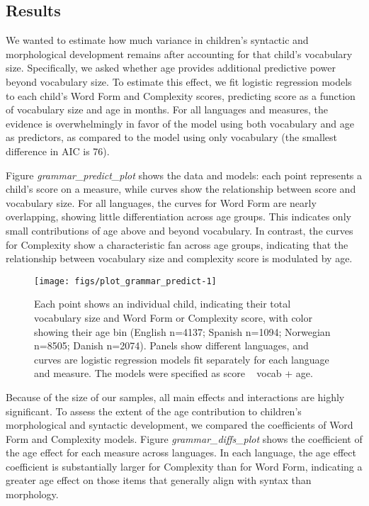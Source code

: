 \documentclass[authoryear, review]{elsarticle}
\newenvironment{CodeChunk}{}{}
\begin{document}
\subsection{Results}\label{results}

We wanted to estimate how much variance in children's syntactic and
morphological development remains after accounting for that child's
vocabulary size. Specifically, we asked whether age provides additional
predictive power beyond vocabulary size. To estimate this effect, we fit
logistic regression models to each child's Word Form and Complexity
scores, predicting score as a function of vocabulary size and age in
months. For all languages and measures, the evidence is overwhelmingly
in favor of the model using both vocabulary and age as predictors, as
compared to the model using only vocabulary (the smallest difference in
AIC is 76).

Figure \emph{grammar\_predict\_plot} shows the data and models: each
point represents a child's score on a measure, while curves show the
relationship between score and vocabulary size. For all languages, the
curves for Word Form are nearly overlapping, showing little
differentiation across age groups. This indicates only small
contributions of age above and beyond vocabulary. In contrast, the
curves for Complexity show a characteristic fan across age groups,
indicating that the relationship between vocabulary size and complexity
score is modulated by age.

\begin{CodeChunk}
\begin{figure}
\texttt{[image: figs/plot\_grammar\_predict-1]} \caption[Each point shows an individual child, indicating their total vocabulary size and Word Form or Complexity score, with color showing their age bin (English n=4137]{Each point shows an individual child, indicating their total vocabulary size and Word Form or Complexity score, with color showing their age bin (English n=4137; Spanish n=1094; Norwegian n=8505; Danish n=2074). Panels show different languages, and curves are logistic regression models fit separately for each language and measure. The models were specified as score ~ vocab + age.}\label{fig:plot_grammar_predict}
\end{figure}
\end{CodeChunk}

Because of the size of our samples, all main effects and interactions
are highly significant. To assess the extent of the age contribution to
children's morphological and syntactic development, we compared the
coefficients of Word Form and Complexity models. Figure
\emph{grammar\_diffs\_plot} shows the coefficient of the age effect for
each measure across languages. In each language, the age effect
coefficient is substantially larger for Complexity than for Word Form,
indicating a greater age effect on those items that generally align with
syntax than morphology.
\end{document}
